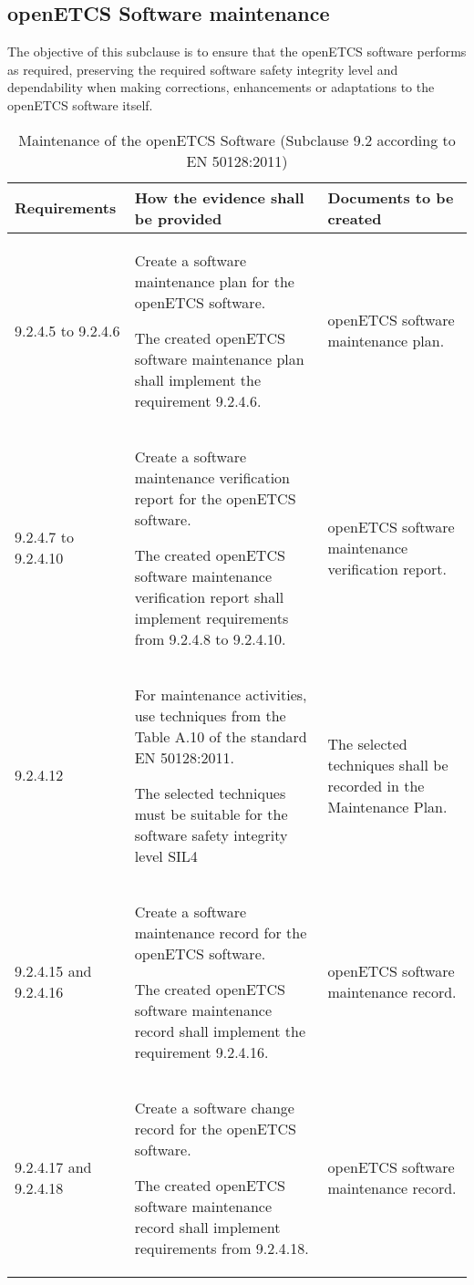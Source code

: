\documentclass{template/openetcs_report}
\begin{document}
\subsection{openETCS Software maintenance}
\begin{flushleft}
The objective of this subclause is to ensure that the openETCS software performs as required, preserving the required software safety integrity level and dependability when making corrections, enhancements or adaptations to the openETCS software itself. 
\end{flushleft}
{\footnotesize\sffamily\centering
\begin{longtable}{|p{2cm}|p{9cm}|p{3cm}|}
\caption{Maintenance of the openETCS Software (Subclause 9.2 according to EN 50128:2011)}\\
\hline
\bfseries Requirements & \bfseries How the evidence shall be provided & \bfseries Documents to be created\\
\hline
\hline
\endhead
\hline
\endfoot

9.2.4.5 to 9.2.4.6 & Create a software maintenance plan for the openETCS software.

The created openETCS software maintenance plan shall implement the requirement 9.2.4.6.
& openETCS software maintenance plan.\\ 
\hline
9.2.4.7 to 9.2.4.10 & Create a software maintenance verification report for the openETCS software.

The created openETCS software maintenance verification report shall implement requirements from 9.2.4.8 to 9.2.4.10.
& openETCS software maintenance verification report.\\ 
\hline
9.2.4.12 & For maintenance activities, use techniques from the Table A.10 of the standard EN 50128:2011.

The selected techniques must be suitable for the software safety integrity level SIL4 
& The selected techniques shall be recorded in the Maintenance Plan.\\ 
\hline
9.2.4.15 and 9.2.4.16 & Create a software maintenance record for the openETCS software.

The created openETCS software maintenance record shall implement the requirement 9.2.4.16.
& openETCS software maintenance record.\\ 
\hline
9.2.4.17 and 9.2.4.18 & Create a software change record for the openETCS software.

The created openETCS software maintenance record shall implement requirements from 9.2.4.18.
& openETCS software maintenance record.\\ 
\hline
\end{longtable}}
\end{document}
